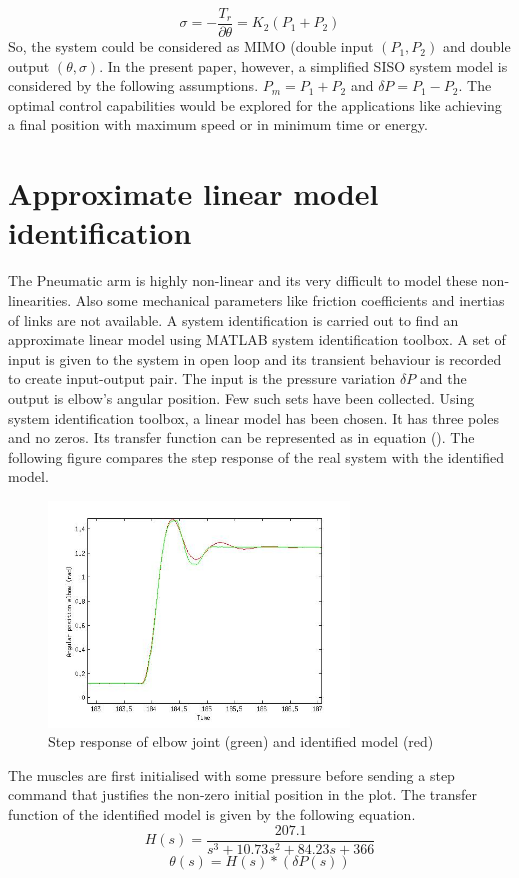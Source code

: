 \documentclass[conference]{IEEEtran}
\begin{document}
\begin{equation}
\sigma = -\frac{T_{r}}{\partial \theta} = K_{2}(P_{1}+P_{2})
\end{equation}
So, the system could  be considered as MIMO (double input $(P_{1}, P_{2})$ and double output $(\theta, \sigma)$.
In the present paper, however, a simplified SISO system model is considered by the following assumptions. 
$P_{m} = P_{1} + P_{2}$ and $\delta P = P_{1} - P_{2}$. The optimal control capabilities would be explored for the applications like achieving a final position with maximum speed or in minimum time or energy.
 

\section{Approximate linear model identification}
The Pneumatic arm is highly non-linear and its very difficult to model these non-linearities. Also some mechanical parameters like friction coefficients and inertias of links are not available. A system identification is carried out to find an approximate linear model using MATLAB system identification toolbox. A set of input is given to the system in open loop and its transient behaviour is recorded to create input-output pair. The input is the pressure variation $\delta P$ and the output is elbow's angular position. Few such sets have been collected. Using system identification toolbox, a linear model has been chosen. It has three poles and no zeros. Its transfer function can be represented as in equation (\cite{eq}). 
The following figure compares the step response of the real system with the identified model.
\begin{figure}[ht!]
\centering
\includegraphics[width=80mm]{identifiedmodel.jpg}
\caption{Step response of elbow joint (green) and identified model (red)\label{Step response}}
\end{figure}
The muscles are first initialised with some pressure before sending a step command that justifies the non-zero initial position in the plot. The transfer function of the identified model is given by the following equation.
\begin{equation}
 H(s) = \frac{207.1}{s^3 + 10.73s^2 + 84.23s +366 }
\end{equation}
\begin{equation}
 \theta(s) = H(s)* (\delta P(s))
\end{equation}
\end{document}
